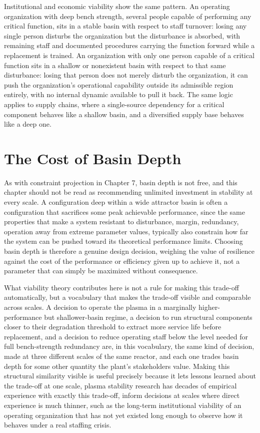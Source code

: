 Institutional and economic viability show the same pattern. An operating organization with deep bench strength, several people capable of performing any critical function, sits in a stable basin with respect to staff turnover: losing any single person disturbs the organization but the disturbance is absorbed, with remaining staff and documented procedures carrying the function forward while a replacement is trained. An organization with only one person capable of a critical function sits in a shallow or nonexistent basin with respect to that same disturbance: losing that person does not merely disturb the organization, it can push the organization's operational capability outside its admissible region entirely, with no internal dynamic available to pull it back. The same logic applies to supply chains, where a single-source dependency for a critical component behaves like a shallow basin, and a diversified supply base behaves like a deep one.

\section{The Cost of Basin Depth}

As with constraint projection in Chapter 7, basin depth is not free, and this chapter should not be read as recommending unlimited investment in stability at every scale. A configuration deep within a wide attractor basin is often a configuration that sacrifices some peak achievable performance, since the same properties that make a system resistant to disturbance, margin, redundancy, operation away from extreme parameter values, typically also constrain how far the system can be pushed toward its theoretical performance limits. Choosing basin depth is therefore a genuine design decision, weighing the value of resilience against the cost of the performance or efficiency given up to achieve it, not a parameter that can simply be maximized without consequence.

What viability theory contributes here is not a rule for making this trade-off automatically, but a vocabulary that makes the trade-off visible and comparable across scales. A decision to operate the plasma in a marginally higher-performance but shallower-basin regime, a decision to run structural components closer to their degradation threshold to extract more service life before replacement, and a decision to reduce operating staff below the level needed for full bench-strength redundancy are, in this vocabulary, the same kind of decision, made at three different scales of the same reactor, and each one trades basin depth for some other quantity the plant's stakeholders value. Making this structural similarity visible is useful precisely because it lets lessons learned about the trade-off at one scale, plasma stability research has decades of empirical experience with exactly this trade-off, inform decisions at scales where direct experience is much thinner, such as the long-term institutional viability of an operating organization that has not yet existed long enough to observe how it behaves under a real staffing crisis.

